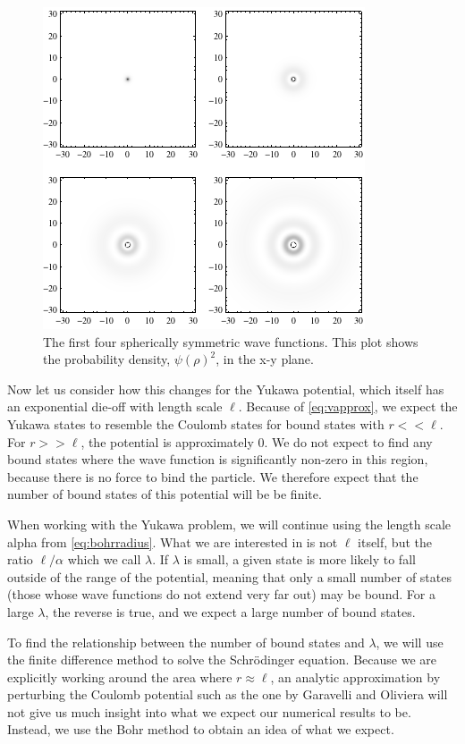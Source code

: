 \documentclass[12pt,twoside]{reedthesis}
\begin{document}
\begin{figure}[h]
\centering
\includegraphics{Figures/densityplots}
\caption[Density plots of the first four spherically symmetric Coulomb wave functions]{The first four spherically symmetric wave functions. This plot shows the probability density, $\psi(\rho)^2$, in the x-y plane.}
\label{fig:boundstates}
\end{figure}

Now let us consider how this changes for the Yukawa potential, which itself has an exponential die-off with length scale $\ell$. Because of \eqref{eq:vapprox}, we expect the Yukawa states to resemble the Coulomb states for bound states with $r << \ell$. For $r >> \ell$, the potential is approximately $0$. We do not expect to find any bound states where the wave function is significantly non-zero in this region, because there is no force to bind the particle. We therefore expect that the number of bound states of this potential will be be finite.

When working with the Yukawa problem, we will continue using the length scale alpha from \eqref{eq:bohrradius}. What we are interested in is not $\ell$ itself, but the ratio $\ell / \alpha$ which we call $\lambda$.
If $\lambda$ is small, a given state is more likely to fall outside of the range of the potential, meaning that only a small number of states (those whose wave functions do not extend very far out) may be bound. For a large $\lambda$, the reverse is true, and we expect a large number of bound states.

To find the relationship between the number of bound states and $\lambda$, we will use the finite difference method to solve the Schr\"odinger equation. Because we are explicitly working around the area where $r \approx \ell$, an analytic approximation by perturbing the Coulomb potential such as the one by Garavelli and Oliviera\cite{PhysRevLett.66.1310} will not give us much insight into what we expect our numerical results to be. Instead, we use the Bohr method to obtain an idea of what we expect.
\end{document}
